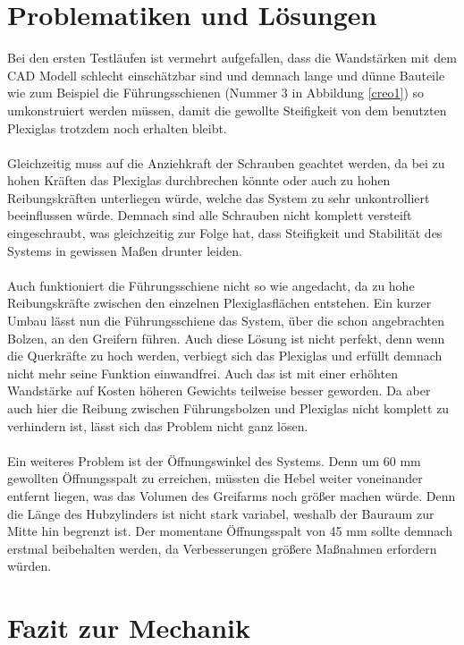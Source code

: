 \section{Problematiken und Lösungen}
Bei den ersten Testläufen ist vermehrt aufgefallen, dass die Wandstärken mit dem CAD Modell schlecht einschätzbar sind und demnach lange und dünne Bauteile wie zum Beispiel die Führungsschienen (Nummer 3 in Abbildung \ref{creo1}) so umkonstruiert werden müssen, damit die gewollte Steifigkeit von dem benutzten Plexiglas trotzdem noch erhalten bleibt.\\
\\
Gleichzeitig muss auf die Anziehkraft der Schrauben geachtet werden, da bei zu hohen Kräften das Plexiglas durchbrechen könnte oder auch zu hohen Reibungskräften unterliegen würde, welche das System zu sehr unkontrolliert beeinflussen würde. Demnach sind alle Schrauben nicht komplett versteift eingeschraubt, was gleichzeitig zur Folge hat, dass Steifigkeit und Stabilität des Systems in gewissen Maßen drunter leiden. \\
\\
Auch funktioniert die Führungsschiene nicht so wie angedacht, da zu hohe Reibungskräfte zwischen den einzelnen Plexiglasflächen entstehen. Ein kurzer Umbau lässt nun die Führungsschiene das System, über die schon angebrachten Bolzen, an den Greifern führen. Auch diese Lösung ist nicht perfekt, denn wenn die Querkräfte zu hoch werden, verbiegt sich das Plexiglas und erfüllt demnach nicht mehr seine Funktion einwandfrei. Auch das ist mit einer erhöhten Wandstärke auf Kosten höheren Gewichts teilweise besser geworden. Da aber auch hier die Reibung zwischen Führungsbolzen und Plexiglas nicht komplett zu verhindern ist, lässt sich das Problem nicht ganz lösen.\\
\\
Ein weiteres Problem ist der Öffnungswinkel des Systems. Denn um 60 mm gewollten Öffnungsspalt zu erreichen, müssten die Hebel weiter voneinander entfernt liegen, was das Volumen des Greifarms noch größer machen würde. Denn die Länge des Hubzylinders ist nicht stark variabel, weshalb der Bauraum zur Mitte hin begrenzt ist. Der momentane Öffnungsspalt von 45 mm sollte demnach erstmal beibehalten werden, da Verbesserungen größere Maßnahmen erfordern würden.
\section{Fazit zur Mechanik}

